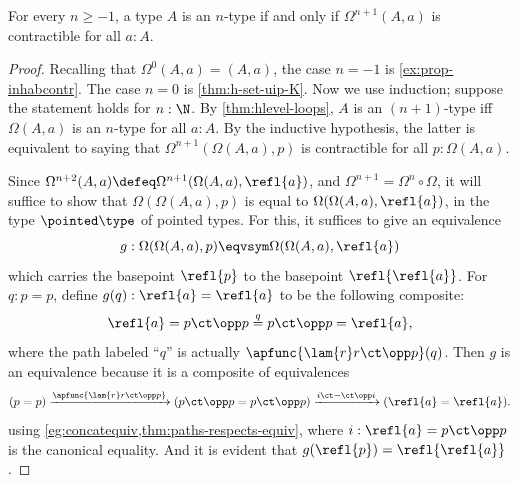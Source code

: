 %
\begin{thm}\label{thm:ntype-nloop}
  For every $n\ge -1$, a type $A$ is an $n$-type if and only if $\Omega^{n+1}(A,a)$ is contractible for all $a:A$.
\end{thm}

\begin{proof}
  Recalling that $\Omega^0(A,a) = (A,a)$, the case $n=-1$ is \cref{ex:prop-inhabcontr}.
  The case $n=0$ is \cref{thm:h-set-uip-K}.
  Now we use induction; suppose the statement holds for $n:\N$.
  By \cref{thm:hlevel-loops}, $A$ is an $(n+1)$-type iff $\Omega(A,a)$ is an $n$-type for all $a:A$.
  By the inductive hypothesis, the latter is equivalent to saying that $\Omega^{n+1}(\Omega(A,a),p)$ is contractible for all $p:\Omega(A,a)$.

  Since $\Omega^{n+2}(A,a) \defeq \Omega^{n+1}(\Omega(A,a),\refl{a})$, and $\Omega^{n+1} = \Omega^n \circ \Omega$, it will suffice to show that $\Omega(\Omega(A,a),p)$ is equal to $\Omega(\Omega(A,a),\refl{a})$, in the type $\pointed\type$ of pointed types.
  For this, it suffices to give an equivalence
  \[ g : \Omega(\Omega(A,a),p) \eqvsym \Omega(\Omega(A,a),\refl{a}) \]
  which carries the basepoint $\refl{p}$ to the basepoint $\refl{\refl{a}}$.
  For $q:p=p$, define $g(q):\refl{a} = \refl{a}$ to be the following composite:
  \[ \refl{a} = p\ct \opp p \overset{q}{=} p\ct\opp p = \refl{a}, \]
  where the path labeled ``$q$'' is actually $\apfunc{\lam{r} r\ct\opp p} (q)$.
  Then $g$ is an equivalence because it is a composite of equivalences
  \[ (p=p) \xrightarrow{\apfunc{\lam{r} r\ct\opp p}} (p\ct \opp p = p\ct \opp p) \xrightarrow{i\ct - \ct \opp i} (\refl{a} = \refl{a}). \]
  using \cref{eg:concatequiv,thm:paths-respects-equiv}, where $i:\refl{a} = p\ct \opp p$ is the canonical equality.
  And it is evident that $g(\refl{p}) = \refl{\refl{a}}$.
\end{proof}
